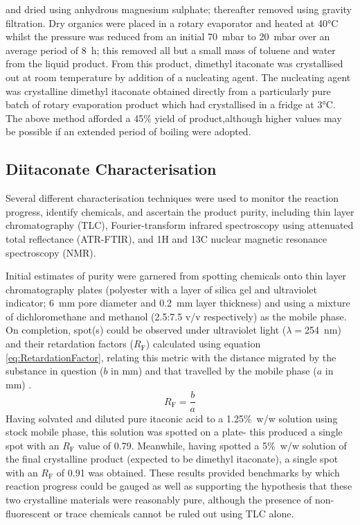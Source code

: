  and dried using anhydrous magnesium sulphate; thereafter removed using
 gravity filtration.
Dry organics were placed in a rotary evaporator and heated at
 40\unit{\degreeCelsius} whilst the pressure was reduced from an initial
 70~\unit{\milli\bar} to 20~\unit{\milli\bar} over an average period of
 8~\unit{\hour}; this removed all but a small mass of toluene and water
 from the liquid product.
From this product, dimethyl itaconate was crystallised out at room
 temperature by addition of a nucleating agent.
The nucleating agent was crystalline dimethyl itaconate obtained directly
 from a particularly pure batch of rotary evaporation product which had
 crystallised in a fridge at 3\unit{\degreeCelsius}.
The above method afforded a 45\unit{\percent} yield of product,although 
 higher values may be possible if an extended period of boiling were 
 adopted.

\subsection{Diitaconate Characterisation}
Several different characterisation techniques were used to monitor the 
 reaction progress, identify chemicals, and ascertain the product purity,
 including thin layer chromatography (TLC), Fourier-transform infrared 
 spectroscopy using attenuated total reflectance (ATR-FTIR), and 1H and 
 13C nuclear magnetic resonance spectroscopy (NMR).

Initial estimates of purity were garnered from spotting chemicals onto
 thin layer chromatography plates (polyester with a layer of silica gel and
 ultraviolet indicator; 6~\unit{\milli\metre} pore diameter and
 0.2~\unit{\milli\metre} layer thickness) and using a mixture of
 dichloromethane and methanol (2.5:7.5 v/v respectively) as the mobile phase.
On completion, spot(s) could be observed under ultraviolet light
 (\(\lambda=\)254~\unit{\nano\metre}) and their retardation factors
 (\(R_{\mathrm{F}}\)) calculated using equation \ref{eq:RetardationFactor},
 relating this metric with the distance migrated by the substance in
 question (\(b\) in \unit{\milli\metre}) and that travelled by the
 mobile phase (\(a\) in \unit{\milli\metre}) \autocite{Ettre1993}.
\begin{equation}\label{eq:RetardationFactor}
    R_{\mathrm{F}}=\frac{b}{a}
\end{equation}
Having solvated and diluted pure itaconic acid to a 1.25\unit{\percent}~w/w
 solution using stock mobile phase, this solution was spotted on a plate- this
 produced a single spot with an \(R_{\mathrm{F}}\) value of 0.79.
Meanwhile, having spotted a 5\unit{\percent}~w/w solution of the final
 crystalline product (expected to be dimethyl itaconate), a single spot with
 an \(R_{\mathrm{F}}\) of 0.91 was obtained.
These results provided benchmarks by which reaction progress could be
 gauged as well as supporting the hypothesis that these two crystalline
 materials were reasonably pure, although the
 presence of non-fluorescent or trace chemicals cannot be ruled out
 using TLC alone.

